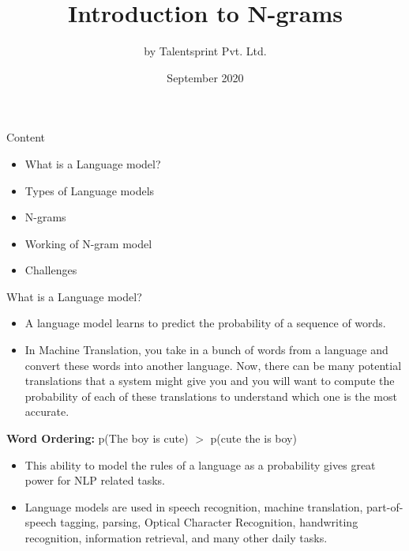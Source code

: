 \documentclass{beamer}
\title{Introduction to N-grams}
\author{by Talentsprint Pvt. Ltd.}
\date{September 2020}
\begin{document}
\maketitle
\begin{frame}{Content}
	\begin{itemize}
		\item What is a Language model?
		\item Types of Language models
		\item N-grams
		\item Working of N-gram model
		\item Challenges
	\end{itemize}
\end{frame}

\begin{frame}{What is a Language model?}
\begin{flushleft}
\begin{itemize}
	\item A language model learns to predict the probability of a sequence of words.
	\item In Machine Translation, you take in a bunch of words from a language and convert these words into another language. Now, there can be many potential translations that a system might give you and you will want to compute the probability of each of these translations to understand which one is the most accurate.\\
	\vspace{10pt}
\end{itemize}
\textbf{Word Ordering:} p(The boy is cute) $>$ p(cute the is boy)\\
\vspace{10pt}
\begin{itemize}
	\item This ability to model the rules of a language as a probability gives great power for NLP related tasks. 
	\item Language models are used in speech recognition, machine translation, part-of-speech tagging, parsing, Optical Character Recognition, handwriting recognition, information retrieval, and many other daily tasks.
	\end{itemize}
\end{flushleft}
\end{frame}
\end{document}
